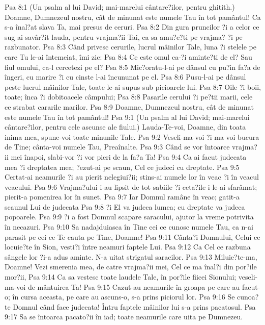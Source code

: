 Psa 8:1  (Un psalm al lui David; mai-marelui cântare?ilor, pentru ghitith.) Doamne, Dumnezeul nostru, cât de minunat este numele Tau în tot pamântul! Ca s-a înal?at slava Ta, mai presus de ceruri.
Psa 8:2  Din gura pruncilor ?i a celor ce sug ai savâr?it lauda, pentru vrajma?ii Tai, ca sa amu?e?ti pe vrajma? ?i pe razbunator.
Psa 8:3  Când privesc cerurile, lucrul mâinilor Tale, luna ?i stelele pe care Tu le-ai întemeiat, îmi zic:
Psa 8:4  Ce este omul ca-?i aminte?ti de el? Sau fiul omului, ca-l cercetezi pe el?
Psa 8:5  Mic?oratu-l-ai pe dânsul cu pu?in fa?a de îngeri, cu marire ?i cu cinste l-ai încununat pe el.
Psa 8:6  Pusu-l-ai pe dânsul peste lucrul mâinilor Tale, toate le-ai supus sub picioarele lui.
Psa 8:7  Oile ?i boii, toate; înca ?i dobitoacele câmpului;
Psa 8:8  Pasarile cerului ?i pe?tii marii, cele ce strabat cararile marilor.
Psa 8:9  Doamne, Dumnezeul nostru, cât de minunat este numele Tau în tot pamântul!
Psa 9:1  (Un psalm al lui David; mai-marelui cântare?ilor, pentru cele ascunse ale fiului.) Lauda-Te-voi, Doamne, din toata inima mea, spune-voi toate minunile Tale.
Psa 9:2  Veseli-ma-voi ?i ma voi bucura de Tine; cânta-voi numele Tau, Preaînalte.
Psa 9:3  Când se vor întoarce vrajma?ii mei înapoi, slabi-vor ?i vor pieri de la fa?a Ta!
Psa 9:4  Ca ai facut judecata mea ?i dreptatea mea; ?ezut-ai pe scaun, Cel ce judeci cu dreptate.
Psa 9:5  Certat-ai neamurile ?i au pierit nelegiui?ii; stins-ai numele lor în veac ?i în veacul veacului.
Psa 9:6  Vrajma?ului i-au lipsit de tot sabiile ?i ceta?ile i le-ai sfarâmat; pierit-a pomenirea lor în sunet.
Psa 9:7  Iar Domnul ramâne în veac; gatit-a scaunul Lui de judecata
Psa 9:8  ?i El va judeca lumea; cu dreptate va judeca popoarele.
Psa 9:9  ?i a fost Domnul scapare saracului, ajutor la vreme potrivita în necazuri.
Psa 9:10  Sa nadajduiasca în Tine cei ce cunosc numele Tau, ca n-ai parasit pe cei ce Te cauta pe Tine, Doamne!
Psa 9:11  Cânta?i Domnului, Celui ce locuie?te în Sion, vesti?i între neamuri faptele Lui.
Psa 9:12  Ca Cel ce razbuna sângele lor ?i-a adus aminte. N-a uitat strigatul saracilor.
Psa 9:13  Miluie?te-ma, Doamne! Vezi smerenia mea, de catre vrajma?ii mei, Cel ce ma înal?i din por?ile mor?ii,
Psa 9:14  Ca sa vestesc toate laudele Tale, în por?ile fiicei Sionului; veseli-ma-voi de mântuirea Ta!
Psa 9:15  Cazut-au neamurile în groapa pe care au facut-o; în cursa aceasta, pe care au ascuns-o, s-a prins piciorul lor.
Psa 9:16  Se cunoa?te Domnul când face judecata! Întru faptele mâinilor lui s-a prins pacatosul.
Psa 9:17  Sa se întoarca pacato?ii în iad; toate neamurile care uita pe Dumnezeu.
